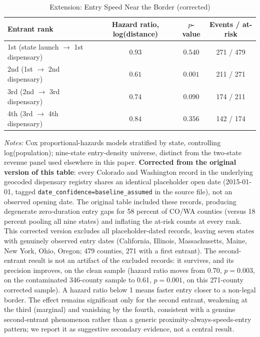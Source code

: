 \begin{table}[htbp]
\centering
\caption{Extension: Entry Speed Near the Border (corrected)}
\label{tab:ae_hazard}
\small
\begin{tabular}{lccc}
\toprule
Entrant rank & Hazard ratio, log(distance) & $p$-value & Events / at-risk \\
\midrule
1st (state launch $\to$ 1st dispensary) & $0.93$ & $0.540$ & 271 / 479 \\
2nd (1st $\to$ 2nd dispensary) & $0.61$ & $0.001$ & 211 / 271 \\
3rd (2nd $\to$ 3rd dispensary) & $0.74$ & $0.090$ & 174 / 211 \\
4th (3rd $\to$ 4th dispensary) & $0.84$ & $0.356$ & 142 / 174 \\
\bottomrule
\end{tabular}
\begin{minipage}{0.95\textwidth}
\vspace{0.3em}
\footnotesize
\textit{Notes:} Cox proportional-hazards models stratified by state, controlling log(population); nine-state
entry-density universe, distinct from the two-state revenue panel used elsewhere in this paper.
\textbf{Corrected from the original version of this table}: every Colorado and Washington record in the
underlying geocoded dispensary registry shares an identical placeholder open date (2015-01-01, tagged
\texttt{date\_confidence=baseline\_assumed} in the source file), not an observed opening date. The original
table included these records, producing degenerate zero-duration entry gaps for 58 percent of CO/WA counties
(versus 18 percent pooling all nine states) and inflating the at-risk counts at every rank. This corrected
version excludes all placeholder-dated records, leaving seven states with genuinely observed entry dates
(California, Illinois, Massachusetts, Maine, New York, Ohio, Oregon; 479 counties, 271 with a first entrant).
The second-entrant result is not an artifact of the excluded records: it survives, and its precision improves,
on the clean sample (hazard ratio moves from 0.70, $p=0.003$, on the contaminated 346-county sample to 0.61,
$p=0.001$, on this 271-county corrected sample). A hazard ratio below 1 means faster entry closer to a
non-legal border. The effect remains significant only for the second entrant, weakening at the third
(marginal) and vanishing by the fourth, consistent with a genuine second-entrant phenomenon rather than a
generic proximity-always-speeds-entry pattern; we report it as suggestive secondary evidence, not a central
result.
\end{minipage}
\end{table}
